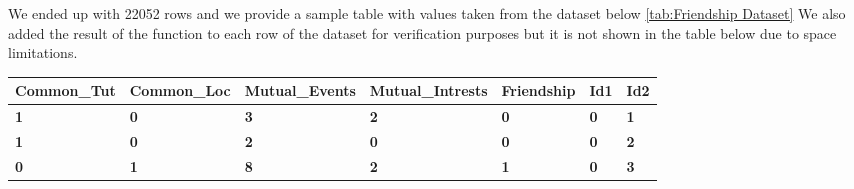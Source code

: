 We ended up with \num{22052}  rows and we provide a sample table with values taken from the dataset below \ref{tab:Friendship Dataset}
We also added the result of the function to each row of the dataset for verification purposes but it is not shown in the table below due to space limitations.
\newline
\newline
\newline
\newline
\newline
\newline
\begin{singlespace}
  \begin{table}[!h]
    \small
    \addtolength{\tabcolsep}{-4pt}
    \begin{tabular}{|l|l|l|l|l|l|l|}
    \hline
    \multicolumn{1}{|c|}{\textbf{Common\_Tut}}             & \textbf{Common\_Loc}                                  & \multicolumn{1}{r|}{\textbf{Mutual\_Events}}           & \textbf{Mutual\_Intrests}                              & \textbf{Friendship}                                    & \textbf{Id1}                                           & \textbf{Id2}                                           \\ \hline
    \textbf{1}                                             & \textbf{0}                                             & \textbf{3}                                             & \textbf{2}                                             & \textbf{0}                                             & \textbf{0}                                             & \textbf{1}                                             \\ \hline
    \textbf{1}                                             & \textbf{0}                                             & \textbf{2}                                             & \textbf{0}                                             & \textbf{0}                                             & \textbf{0}                                             & \textbf{2}                                             \\ \hline
    \textbf{0}                                             & \textbf{1}                                             & \textbf{8}                                             & \textbf{2}                                             & \textbf{1}                                             & \textbf{0}                                             & \textbf{3}                                             \\ \hline

\end{tabular}
\end{table}
\end{singlespace}
